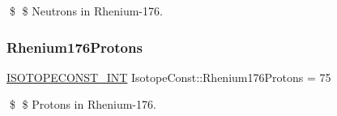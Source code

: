 \$ \$ Neutrons in Rhenium-\/176. \mbox{\label{group___isotope_const-_rhenium-_re176_ga2e0a87d0e60f475b4f17a37c0b3e4520}} 
\subsubsection{\texorpdfstring{Rhenium176\+Protons}{Rhenium176Protons}}
{\footnotesize\ttfamily \mbox{\hyperlink{group___isotope_const-_macros_ga5f18360b3e99483a35c32d789e62621c}{I\+S\+O\+T\+O\+P\+E\+C\+O\+N\+S\+T\+\_\+\+I\+NT}} Isotope\+Const\+::\+Rhenium176\+Protons = 75}

\$ \$ Protons in Rhenium-\/176. 